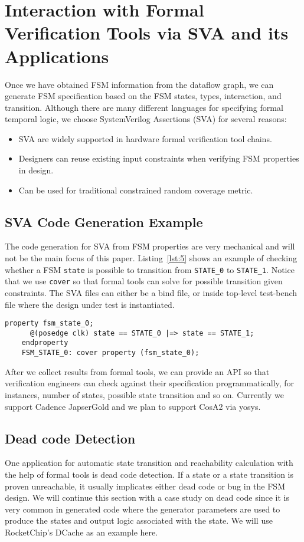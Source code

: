 \documentclass{article}
\begin{document}
\section{Interaction with Formal Verification Tools via SVA and its Applications}
Once we have obtained FSM information from the dataflow graph, we can generate FSM specification
based on the FSM states, types, interaction, and transition. Although there are many different
languages for specifying formal temporal logic, we choose SystemVerilog Assertions (SVA) for
several reasons:
\begin{itemize}
    \item SVA are widely supported in hardware formal verification tool chains.
    \item Designers can reuse existing input constraints when verifying FSM properties in design.
    \item Can be used for traditional constrained random coverage metric.
\end{itemize}

\subsection{SVA Code Generation Example}
The code generation for SVA from FSM properties are very mechanical and will not be the main
focus of this paper. Listing~\ref{lst:5} shows an example of checking whether a FSM \texttt{state}
is possible to transition from \texttt{STATE\_0} to \texttt{STATE\_1}. Notice that we use
\texttt{cover} so that formal tools can solve for possible transition given constraints.
The SVA files can either be a bind file, or inside top-level test-bench file where the
design under test is instantiated.

\begin{lstlisting}[style={verilog-style}, caption={SVA code example for state transition
    coverage},
    label={lst:5}]
    property fsm_state_0;
      @(posedge clk) state == STATE_0 |=> state == STATE_1;
    endproperty
    FSM_STATE_0: cover property (fsm_state_0);
\end{lstlisting}

After we collect results from formal tools, we can provide an API so that verification
engineers can check against their specification programmatically, for instances, number
of states, possible state transition and so on. Currently we support Cadence JapserGold
and we plan to support CosA2 via yosys.

\subsection{Dead code Detection}
One application for automatic state transition and reachability calculation with the help
of formal tools is dead code detection. If a state or a state transition is proven unreachable,
it usually implicates either dead code or bug in the FSM design. We will continue this section
with a case study on dead code since it is very common in generated code where the generator
parameters are used to produce the states and output logic associated with the state. We will
use RocketChip's DCache as an example here.
\end{document}
